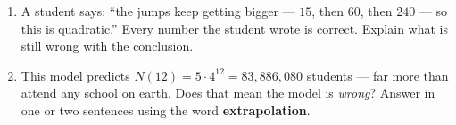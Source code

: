 \begin{enumerate}[leftmargin=1.8em, itemsep=8pt, topsep=5pt]
\begin{enumerate}[label=(\alph*), leftmargin=1.8em, itemsep=4pt, topsep=4pt]
  \item A student says: ``the jumps keep getting bigger --- $15$, then $60$, then $240$ --- so this
        is quadratic.'' Every number the student wrote is correct. Explain what is still wrong with
        the conclusion.


  \item This model predicts $N(12) = 5 \cdot 4^{12} = 83{,}886{,}080$ students --- far more than
        attend any school on earth. Does that mean the model is \emph{wrong}? Answer in one or two
        sentences using the word \textbf{extrapolation}.

\end{enumerate}

\end{enumerate}


